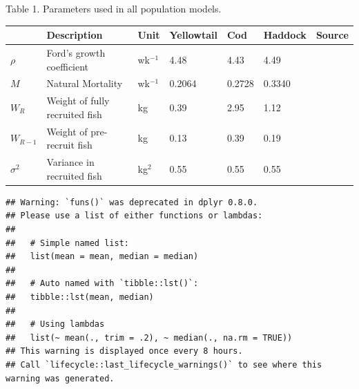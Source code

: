 \documentclass[
  12pt,
]{article}
\begin{document}
\pagebreak

Table 1. Parameters used in all population models.

\begin{longtable}[]{@{}lllllll@{}}
\toprule
& Description & Unit & Yellowtail & Cod & Haddock & Source \\
\midrule
\endhead
\(\rho\) & Ford's growth coefficient & wk\(^{-1}\) & 4.48 & 4.43 & 4.49 & \\
\(M\) & Natural Mortality & wk\(^{-1}\) & 0.2064 & 0.2728 & 0.3340 & \\
\(W_R\) & Weight of fully recruited fish & kg & 0.39 & 2.95 & 1.12 & \\
\(W_{R-1}\) & Weight of pre-recruit fish & kg & 0.13 & 0.39 & 0.19 & \\
\(\sigma^2\) & Variance in recruited fish & kg\(^2\) & 0.55 & 0.55 & 0.55 & \\
\bottomrule
\end{longtable}

\begin{verbatim}
## Warning: `funs()` was deprecated in dplyr 0.8.0.
## Please use a list of either functions or lambdas: 
## 
##   # Simple named list: 
##   list(mean = mean, median = median)
## 
##   # Auto named with `tibble::lst()`: 
##   tibble::lst(mean, median)
## 
##   # Using lambdas
##   list(~ mean(., trim = .2), ~ median(., na.rm = TRUE))
## This warning is displayed once every 8 hours.
## Call `lifecycle::last_lifecycle_warnings()` to see where this warning was generated.
\end{verbatim}
\end{document}
